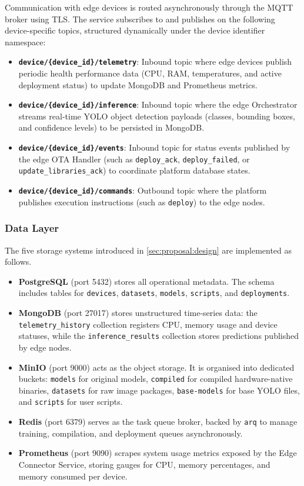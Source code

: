 Communication with edge devices is routed asynchronously through the \gls{MQTT} broker using \gls{TLS}. The service subscribes to and publishes on the following device-specific topics, structured dynamically under the device identifier namespace:
\begin{itemize}
    \item \textbf{\texttt{device/\{device\_id\}/telemetry}}: Inbound topic where edge devices publish periodic health performance data (\gls{CPU}, \gls{RAM}, temperatures, and active deployment status) to update MongoDB and Prometheus metrics.
    \item \textbf{\texttt{device/\{device\_id\}/inference}}: Inbound topic where the edge Orchestrator streams real-time YOLO object detection payloads (classes, bounding boxes, and confidence levels) to be persisted in MongoDB.
    \item \textbf{\texttt{device/\{device\_id\}/events}}: Inbound topic for status events published by the edge \gls{OTA} Handler (such as \texttt{deploy\_ack}, \texttt{deploy\_failed}, or \texttt{update\_libraries\_ack}) to coordinate platform database states.
    \item \textbf{\texttt{device/\{device\_id\}/commands}}: Outbound topic where the platform publishes execution instructions (such as \texttt{deploy}) to the edge nodes.
\end{itemize}

\subsubsection{Data Layer}\label{sec:impl:data}

The five storage systems introduced in \autoref{sec:proposal:design} are implemented as follows.

\begin{itemize}
    \item \textbf{PostgreSQL} (port 5432) stores all operational metadata. The schema includes tables for \texttt{devices}, \texttt{datasets}, \texttt{models}, \texttt{scripts}, and \texttt{deployments}.
    \item \textbf{MongoDB} (port 27017) stores unstructured time-series data: the \texttt{telemetry\_history} collection registers \gls{CPU}, memory usage and device statuses, while the \texttt{inference\_results} collection stores predictions published by edge nodes.
    \item \textbf{MinIO} (port 9000) acts as the object storage. It is organised into dedicated buckets: \texttt{models} for original models, \texttt{compiled} for compiled hardware-native binaries, \texttt{datasets} for raw image packages, \texttt{base-models} for base YOLO files, and \texttt{scripts} for user scripts.
    \item \textbf{Redis} (port 6379) serves as the task queue broker, backed by \texttt{arq} to manage training, compilation, and deployment queues asynchronously.
    \item \textbf{Prometheus} (port 9090) scrapes system usage metrics exposed by the Edge Connector Service, storing gauges for \gls{CPU}, memory percentages, and memory consumed per device.
\end{itemize}

